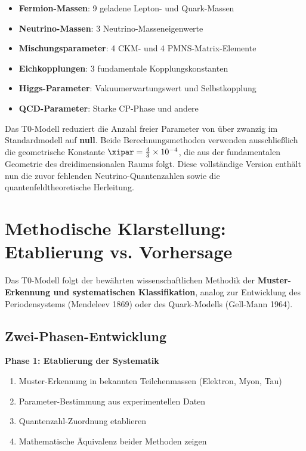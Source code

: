 	\begin{itemize}
		\item \textbf{Fermion-Massen}: 9 geladene Lepton- und Quark-Massen
		\item \textbf{Neutrino-Massen}: 3 Neutrino-Masseneigenwerte
		\item \textbf{Mischungsparameter}: 4 CKM- und 4 PMNS-Matrix-Elemente
		\item \textbf{Eichkopplungen}: 3 fundamentale Kopplungskonstanten
		\item \textbf{Higgs-Parameter}: Vakuumerwartungswert und Selbstkopplung
		\item \textbf{QCD-Parameter}: Starke CP-Phase und andere
	\end{itemize}
	
	\begin{important}
		Das T0-Modell reduziert die Anzahl freier Parameter von über zwanzig im Standardmodell auf \textbf{null}. Beide Berechnungsmethoden verwenden ausschließlich die geometrische Konstante $\xipar = \frac{4}{3} \times 10^{-4}$, die aus der fundamentalen Geometrie des dreidimensionalen Raums folgt. Diese vollständige Version enthält nun die zuvor fehlenden Neutrino-Quantenzahlen sowie die quantenfeldtheoretische Herleitung.
	\end{important}
	
	\section{Methodische Klarstellung: Etablierung vs. Vorhersage}
	\label{sec:methodische_klarstellung}
	
	\begin{important}
		Das T0-Modell folgt der bewährten wissenschaftlichen Methodik der \textbf{Muster-Erkennung und systematischen Klassifikation}, analog zur Entwicklung des Periodensystems (Mendeleev 1869) oder des Quark-Modells (Gell-Mann 1964).
	\end{important}
	
	\subsection{Zwei-Phasen-Entwicklung}
	\label{subsec:zwei_phasen}
	
	\textbf{Phase 1: Etablierung der Systematik}
	\begin{enumerate}
		\item Muster-Erkennung in bekannten Teilchenmassen (Elektron, Myon, Tau)
		\item Parameter-Bestimmung aus experimentellen Daten
		\item Quantenzahl-Zuordnung etablieren
		\item Mathematische Äquivalenz beider Methoden zeigen
	\end{enumerate}
	
